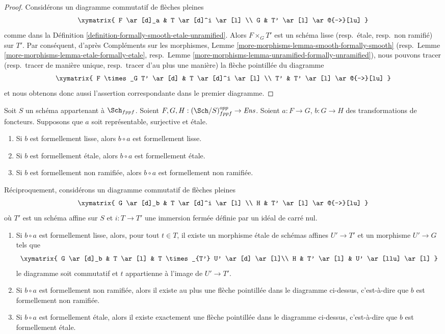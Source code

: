 \begin{proof}
Considérons un diagramme commutatif de flèches pleines
$$
\xymatrix{
F \ar[d]_a & T \ar[d]^i \ar[l] \\
G & T' \ar[l] \ar@{-->}[lu]
}
$$
comme dans la
Définition \ref{definition-formally-smooth-etale-unramified}.
Alors $F \times_G T'$ est un schéma lisse (resp.\ étale, resp.\ non ramifié)
sur $T'$. Par conséquent, d'après
Compléments sur les morphismes, Lemme \ref{more-morphisms-lemma-smooth-formally-smooth}
(resp.\ Lemme \ref{more-morphisms-lemma-etale-formally-etale},
resp.\ Lemme \ref{more-morphisms-lemma-unramified-formally-unramified}),
nous pouvons tracer (resp.\ tracer de manière unique, resp.\ tracer d'au plus
une manière) la flèche pointillée du diagramme
$$
\xymatrix{
F \times_G T' \ar[d] & T \ar[d]^i \ar[l] \\
T' & T' \ar[l] \ar@{-->}[lu]
}
$$
et nous obtenons donc aussi l'assertion correspondante dans le premier diagramme.
\end{proof}

\begin{lemma}
\label{lemma-etale-on-top}
Soit $S$ un schéma appartenant à $\Sch_{fppf}$.
Soient $F, G, H : (\Sch/S)_{fppf}^{opp} \to \textit{Ens}$.
Soient $a : F \to G$, $b : G \to H$ des transformations de foncteurs.
Supposons que $a$ soit représentable, surjective et étale.
\begin{enumerate}
\item Si $b$ est formellement lisse, alors $b \circ a$ est formellement lisse.
\item Si $b$ est formellement étale, alors $b \circ a$ est formellement étale.
\item Si $b$ est formellement non ramifiée, alors $b \circ a$ est formellement non ramifiée.
\end{enumerate}
Réciproquement, considérons un diagramme commutatif de flèches pleines
$$
\xymatrix{
G \ar[d]_b & T \ar[d]^i \ar[l] \\
H & T' \ar[l] \ar@{-->}[lu]
}
$$
où $T'$ est un schéma affine sur $S$
et $i : T \to T'$ une immersion fermée définie par un idéal de carré nul.
\begin{enumerate}
\item[(4)] Si $b \circ a$ est formellement lisse, alors, pour tout $t \in T$,
il existe un morphisme étale de schémas affines $U' \to T'$ et un morphisme
$U' \to G$ tels que
$$
\xymatrix{
G \ar[d]_b & T \ar[l] & T \times_{T'} U' \ar[d] \ar[l]\\
H & T' \ar[l] & U' \ar[llu] \ar[l]
}
$$
le diagramme soit commutatif et $t$ appartienne à l'image de $U' \to T'$.
\item[(5)] Si $b \circ a$ est formellement non ramifiée, alors il existe au plus
une flèche pointillée dans le diagramme ci-dessus, c'est-à-dire que $b$ est formellement non ramifiée.
\item[(6)] Si $b \circ a$ est formellement étale, alors il existe exactement une
flèche pointillée dans le diagramme ci-dessus, c'est-à-dire que $b$ est formellement étale.
\end{enumerate}
\end{lemma}

